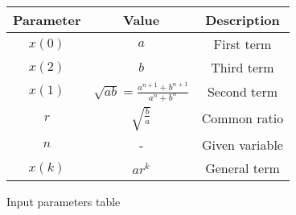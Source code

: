 \centering
\begin{tabular}{|c|c|c|}
        \hline
        \textbf{Parameter} & \textbf{Value} & \textbf{Description} \\
        \hline
	$x(0)$ & $a$ & First term \\
        \hline
	$x(2)$ & $b$ & Third term \\
	\hline
	$x(1)$ & $\sqrt{ab}=\frac{a^{n+1}+b^{n+1}}{a^{n}+b^{n}}$ & Second term\\
	\hline
	$r$ & $\sqrt{\frac{b}{a}}$ & Common ratio \\
	\hline
        $n$ & - & Given variable \\
        \hline
	$x(k)$ & $ar^{k}$ & General term \\
	\hline
\end{tabular}
\caption{Input parameters table}
\label{tab:1}

